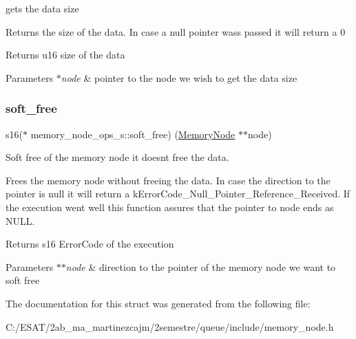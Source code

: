 gets the data size 

Returns the size of the data. In case a null pointer wass passed it will return a 0

\begin{DoxyReturn}{Returns}
u16 size of the data 
\end{DoxyReturn}

\begin{DoxyParams}{Parameters}
{\em $\ast$node} & pointer to the node we wish to get the data size \\
\hline
\end{DoxyParams}
\mbox{\label{structmemory__node__ops__s_a51993e6d5aeb1025181ba5ae46e9f0a8}} 
\subsubsection{\texorpdfstring{soft\+\_\+free}{soft\_free}}
{\footnotesize\ttfamily s16($\ast$ memory\+\_\+node\+\_\+ops\+\_\+s\+::soft\+\_\+free) (\hyperlink{structmemory__node__s}{Memory\+Node} $\ast$$\ast$node)}



Soft free of the memory node it doesn\textquotesingle{}t free the data. 

Frees the memory node without freeing the data. In case the direction to the pointer is null it will return a k\+Error\+Code\+\_\+\+Null\+\_\+\+Pointer\+\_\+\+Reference\+\_\+\+Received. If the execution went well this function assures that the pointer to node ends as N\+U\+LL.

\begin{DoxyReturn}{Returns}
s16 Error\+Code of the execution 
\end{DoxyReturn}

\begin{DoxyParams}{Parameters}
{\em $\ast$$\ast$node} & direction to the pointer of the memory node we want to soft free \\
\hline
\end{DoxyParams}


The documentation for this struct was generated from the following file\+:\begin{DoxyCompactItemize}
\item 
C\+:/\+E\+S\+A\+T/2ab\+\_\+ma\+\_\+martinezcajm/2semestre/queue/include/memory\+\_\+node.\+h\end{DoxyCompactItemize}
